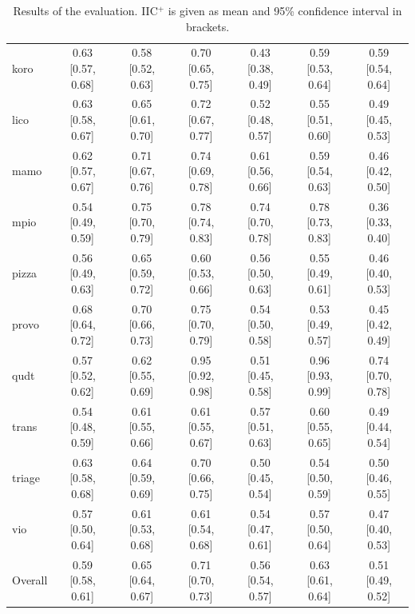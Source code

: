 \begin{table}[htbp]
\begin{widepage}
\begin{tabular}{|l|cccccc|}
      koro & 0.63 [0.57, 0.68] & 0.58 [0.52, 0.63] & 0.70 [0.65, 0.75] & 0.43 [0.38, 0.49] & 0.59 [0.53, 0.64] & 0.59 [0.54, 0.64] \\
      lico & 0.63 [0.58, 0.67] & 0.65 [0.61, 0.70] & 0.72 [0.67, 0.77] & 0.52 [0.48, 0.57] & 0.55 [0.51, 0.60] & 0.49 [0.45, 0.53] \\
      mamo & 0.62 [0.57, 0.67] & 0.71 [0.67, 0.76] & 0.74 [0.69, 0.78] & 0.61 [0.56, 0.66] & 0.59 [0.54, 0.63] & 0.46 [0.42, 0.50] \\
      mpio & 0.54 [0.49, 0.59] & 0.75 [0.70, 0.79] & 0.78 [0.74, 0.83] & 0.74 [0.70, 0.78] & 0.78 [0.73, 0.83] & 0.36 [0.33, 0.40] \\
      pizza & 0.56 [0.49, 0.63] & 0.65 [0.59, 0.72] & 0.60 [0.53, 0.66] & 0.56 [0.50, 0.63] & 0.55 [0.49, 0.61] & 0.46 [0.40, 0.53] \\
      provo & 0.68 [0.64, 0.72] & 0.70 [0.66, 0.73] & 0.75 [0.70, 0.79] & 0.54 [0.50, 0.58] & 0.53 [0.49, 0.57] & 0.45 [0.42, 0.49] \\
      qudt & 0.57 [0.52, 0.62] & 0.62 [0.55, 0.69] & 0.95 [0.92, 0.98] & 0.51 [0.45, 0.58] & 0.96 [0.93, 0.99] & 0.74 [0.70, 0.78] \\
      trans & 0.54 [0.48, 0.59] & 0.61 [0.55, 0.66] & 0.61 [0.55, 0.67] & 0.57 [0.51, 0.63] & 0.60 [0.55, 0.65] & 0.49 [0.44, 0.54] \\
      triage & 0.63 [0.58, 0.68] & 0.64 [0.59, 0.69] & 0.70 [0.66, 0.75] & 0.50 [0.45, 0.54] & 0.54 [0.50, 0.59] & 0.50 [0.46, 0.55] \\
      vio & 0.57 [0.50, 0.64] & 0.61 [0.53, 0.68] & 0.61 [0.54, 0.68] & 0.54 [0.47, 0.61] & 0.57 [0.50, 0.64] & 0.47 [0.40, 0.53] \\
      \hline
      Overall & 0.59 [0.58, 0.61] & 0.65 [0.64, 0.67] & 0.71 [0.70, 0.73] & 0.56 [0.54, 0.57] & 0.63 [0.61, 0.64] & 0.51 [0.49, 0.52] \\
      \hline
    \end{tabular}
  \end{widepage}
  \caption{Results of the evaluation. IIC$^+$ is given as mean and 95\% confidence interval in brackets.}
\end{table}

